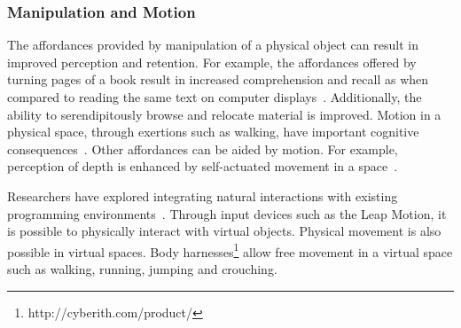 \documentclass[conference]{IEEEtran}
\begin{document}

\subsubsection{Manipulation and Motion}

The affordances provided by manipulation of a physical object can result in improved perception and retention. 
For example, the affordances offered by turning pages of a book result in increased comprehension and recall as when compared to reading the same text on computer displays~\cite{Noyes:2008}.
Additionally, the ability to serendipitously browse and relocate material is improved.
Motion in a physical space, through exertions such as walking, have important cognitive consequences~\cite{Oppezzo:2014}.
Other affordances can be aided by motion. For example, perception of depth is enhanced by self-actuated movement in a space~\cite{Held:1963}.

Researchers have explored integrating natural interactions with existing programming environments~\cite{Delimarschi:2014}.
Through input devices such as the Leap Motion, it is possible to physically interact with virtual objects.
Physical movement is also possible in virtual spaces.  Body harnesses\footnote{http://cyberith.com/product/} allow free movement in a virtual space such as walking, running, jumping and crouching.%




\end{document}

